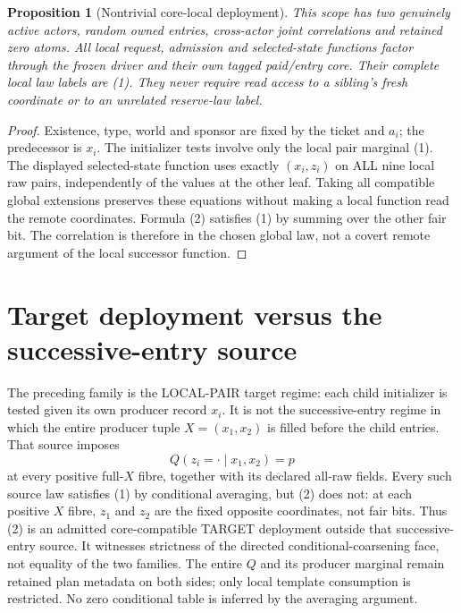 \documentclass[11pt]{article}
\newtheorem{proposition}{Proposition}
\begin{document}
\begin{proposition}[Nontrivial core-local deployment]
This scope has two genuinely active actors, random owned entries, cross-actor joint correlations and retained zero atoms. All local request, admission and selected-state functions factor through the frozen driver and their own tagged paid/entry core. Their complete local law labels are (1). They never require read access to a sibling's fresh coordinate or to an unrelated reserve-law label.
\end{proposition}
\begin{proof}
Existence, type, world and sponsor are fixed by the ticket and $a_i$; the predecessor is $x_i$. The initializer tests involve only the local pair marginal (1). The displayed selected-state function uses exactly $(x_i,z_i)$ on ALL nine local raw pairs, independently of the values at the other leaf. Taking all compatible global extensions preserves these equations without making a local function read the remote coordinates. Formula (2) satisfies (1) by summing over the other fair bit. The correlation is therefore in the chosen global law, not a covert remote argument of the local successor function.\end{proof}

\section{Target deployment versus the successive-entry source}
The preceding family is the LOCAL-PAIR target regime: each child initializer is tested given its own producer record $x_i$. It is not the successive-entry regime in which the entire producer tuple $X=(x_1,x_2)$ is filled before the child entries. That source imposes
\[
             Q(z_i=\cdot\mid x_1,x_2)=p
\]
at every positive full-$X$ fibre, together with its declared all-raw fields. Every such source law satisfies (1) by conditional averaging, but (2) does not: at each positive $X$ fibre, $z_1$ and $z_2$ are the fixed opposite coordinates, not fair bits. Thus (2) is an admitted core-compatible TARGET deployment outside that successive-entry source. It witnesses strictness of the directed conditional-coarsening face, not equality of the two families. The entire $Q$ and its producer marginal remain retained plan metadata on both sides; only local template consumption is restricted. No zero conditional table is inferred by the averaging argument.
\end{document}
